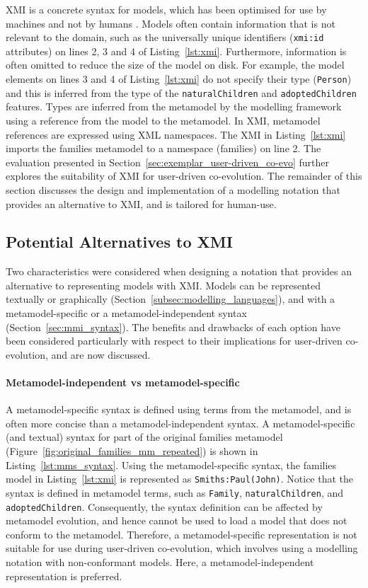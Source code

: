 XMI is a concrete syntax for models, which has been optimised for use by machines and not by humans \cite{hutn}. Models often contain information that is not relevant to the domain, such as the universally unique identifiers (\texttt{xmi:id} attributes) on lines 2, 3 and 4 of Listing~\ref{lst:xmi}. Furthermore, information is often omitted to reduce the size of the model on disk. For example, the model elements on lines 3 and 4 of Listing~\ref{lst:xmi} do not specify their type (\texttt{Pe\-rs\-on}) and this is inferred from the type of the \texttt{na\-tu\-ralCh\-il\-dr\-en} and \texttt{ad\-op\-t\-edCh\-il\-dr\-en} features. Types are inferred from the metamodel by the modelling framework using a reference from the model to the metamodel. In XMI, metamodel references are expressed using XML namespaces. The XMI in Listing~\ref{lst:xmi} imports the families metamodel to a namespace (families) on line 2. The evaluation presented in Section~\ref{sec:exemplar_user-driven_co-evo} further explores the suitability of XMI for user-driven co-evolution. The remainder of this section discusses the design and implementation of a modelling notation that provides an alternative to XMI, and is tailored for human-use.

\subsection{Potential Alternatives to XMI}
\label{subsec:alternatives_to_xmi}
Two characteristics were considered when designing a notation that provides an alternative to representing models with XMI. Models can be represented textually or graphically (Section~\ref{subsec:modelling_languages}), and with a metamodel-specific or a metamodel-independent syntax (Section~\ref{sec:mmi_syntax}). The benefits and drawbacks of each option have been considered particularly with respect to their implications for user-driven co-evolution, and are now discussed.

\paragraph{Metamodel-independent vs metamodel-specific} A metamodel-specific syntax is defined using terms from the metamodel, and is often more concise than a metamodel-independent syntax. A metamodel-specific (and textual) syntax for part of the original families metamodel (Figure~\ref{fig:original_families_mm_repeated}) is shown in Listing~\ref{lst:mms_syntax}. Using the metamodel-specific syntax, the families model in Listing~\ref{lst:xmi} is represented as \texttt{Smiths:Paul(John)}. Notice that the syntax is defined in metamodel terms, such as \texttt{Fa\-mi\-ly}, \texttt{na\-tu\-ralCh\-il\-dr\-en}, and \texttt{ad\-op\-tedCh\-il\-dr\-en}. Consequently, the syntax definition can be affected by metamodel evolution, and hence cannot be used to load a model that does not conform to the metamodel. Therefore, a metamodel-specific representation is not suitable for use during user-driven co-evolution, which involves using a modelling notation with non-conformant models. Here, a metamodel-independent representation is preferred.

